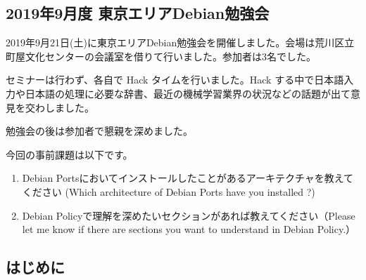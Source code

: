 \documentclass[mingoth,a4paper]{jsarticle}
\begin{document}

\subsection{2019年9月度 東京エリアDebian勉強会}

2019年9月21日(土)に東京エリアDebian勉強会を開催しました。会場は荒川区立町屋文化センターの会議室を借りて行いました。参加者は3名でした。

セミナーは行わず、各自で Hack タイムを行いました。Hack する中で日本語入力や日本語の処理に必要な辞書、最近の機械学習業界の状況などの話題が出て意見を交わしました。

勉強会の後は参加者で懇親を深めました。



今回の事前課題は以下です。

\begin{enumerate}
\item Debian Portsにおいてインストールしたことがあるアーキテクチャを教えてください (Which architecture of Debian Ports have you installed ?)
\item Debian Policyで理解を深めたいセクションがあれば教えてください（Please let me know if there are sections you want to understand in Debian Policy.）
\end{enumerate}


\begin{multicols}{2}
{\small

}
\end{multicols}

%
%
%
%




\subsection{はじめに}
\end{document}
